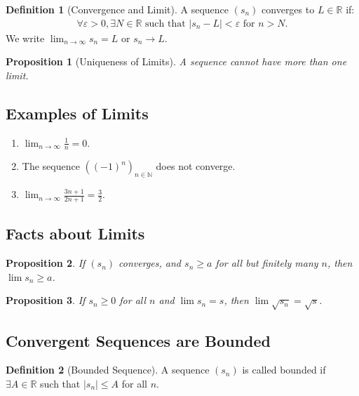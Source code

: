 \documentclass[9pt]{article}
\theoremstyle{definition}
\newtheorem{definition}{Definition}
\theoremstyle{plain}
\newtheorem{proposition}{Proposition}
\begin{document}
\begin{definition}[Convergence and Limit]
A sequence $ (s_n) $ converges to $ L \in \mathbb{R} $ if:
\begin{align}
\forall \varepsilon > 0, \exists N \in \mathbb{R} \text{ such that } |s_n - L| < \varepsilon \text{ for } n > N.
\end{align}
We write $ \lim_{n \to \infty} s_n = L $ or $ s_n \to L $.
\end{definition}

\begin{proposition}[Uniqueness of Limits]
A sequence cannot have more than one limit.
\end{proposition}

\subsection*{Examples of Limits}
\begin{enumerate}[label=\arabic*.]
    \item $ \lim_{n \to \infty} \frac{1}{n} = 0 $.
    \item The sequence $ ((-1)^n)_{n \in \mathbb{N}} $ does not converge.
    \item $ \lim_{n \to \infty} \frac{3n + 1}{2n + 1} = \frac{3}{2} $.
\end{enumerate}

\subsection*{Facts about Limits}
\begin{proposition}
If $ (s_n) $ converges, and $ s_n \geq a $ for all but finitely many $ n $, then $ \lim s_n \geq a $.
\end{proposition}

\begin{proposition}
If $ s_n \geq 0 $ for all $ n $ and $ \lim s_n = s $, then $ \lim \sqrt{s_n} = \sqrt{s} $.
\end{proposition}

\subsection*{Convergent Sequences are Bounded}
\begin{definition}[Bounded Sequence]
A sequence $ (s_n) $ is called bounded if $ \exists A \in \mathbb{R} $ such that $ |s_n| \leq A $ for all $ n $.
\end{definition}
\end{document}
